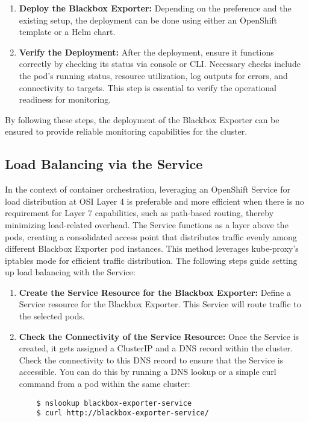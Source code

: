 \begin{enumerate}
    \item \textbf{Deploy the Blackbox Exporter:}
    Depending on the preference and the existing setup, the deployment can be done using either an OpenShift template or a Helm chart. 
    \item \textbf{Verify the Deployment:}
    After the deployment, ensure it functions correctly by checking its status via console or \ac{CLI}. Necessary checks include the pod's running status, resource utilization, log outputs for errors, and connectivity to targets. This step is essential to verify the operational readiness for monitoring. 
\end{enumerate}

By following these steps, the deployment of the Blackbox Exporter can be ensured to provide reliable monitoring capabilities for the cluster.

\subsection{Load Balancing via the Service}

In the context of container orchestration, leveraging an OpenShift Service for load distribution at OSI Layer 4 is preferable and more efficient when there is no requirement for Layer 7 capabilities, such as path-based routing, thereby minimizing load-related overhead. The Service functions as a layer above the pods, creating a consolidated access point that distributes traffic evenly among different Blackbox Exporter pod instances. This method leverages kube-proxy's iptables mode for efficient traffic distribution. The following steps guide setting up load balancing with the Service: 

\begin{enumerate}
    \item \textbf{Create the Service Resource for the Blackbox Exporter:}
    Define a Service resource for the Blackbox Exporter. This Service will route traffic to the selected pods. 
    \item \textbf{Check the Connectivity of the Service Resource:}
    Once the Service is created, it gets assigned a ClusterIP and a DNS record within the cluster. Check the connectivity to this DNS record to ensure that the Service is accessible. You can do this by running a DNS lookup or a simple curl command from a pod within the same cluster: 
    \begin{verbatim}
    $ nslookup blackbox-exporter-service
    $ curl http://blackbox-exporter-service/
    \end{verbatim}
\end{enumerate}

